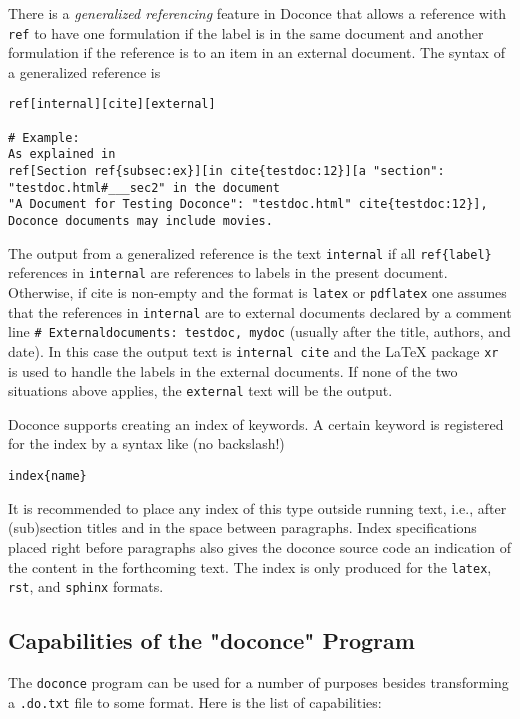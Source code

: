 \documentclass[%
oneside,                 %
final,                   %
10pt]{article}
\begin{document}
There is a \emph{generalized referencing} feature in Doconce that allows
a reference with \Verb!ref! to have one formulation if the label is
in the same document and another formulation if the reference is
to an item in an external document. The syntax of a generalized
reference is
\begin{Verbatim}[numbers=none,fontsize=\fontsize{9pt}{9pt},baselinestretch=0.85,xleftmargin=0mm]
ref[internal][cite][external]

# Example:
As explained in
ref[Section ref{subsec:ex}][in cite{testdoc:12}][a "section":
"testdoc.html#___sec2" in the document
"A Document for Testing Doconce": "testdoc.html" cite{testdoc:12}],
Doconce documents may include movies.
\end{Verbatim}
The output from a generalized reference is the text \Verb!internal! if all
\Verb!ref{label}! references in \Verb!internal! are references to labels in the
present document. Otherwise, if cite is non-empty and the format is
\Verb!latex! or \Verb!pdflatex! one assumes that the references in \Verb!internal!
are to external documents declared by a comment line \Verb!# Externaldocuments: testdoc, mydoc! (usually after the title, authors,
and date). In this case the output text is \Verb!internal cite! and the
{\LaTeX} package \Verb!xr! is used to handle the labels in the external
documents.  If none of the two situations above applies, the
\Verb!external! text will be the output.

Doconce supports creating an index of keywords. A certain keyword
is registered for the index by a syntax like (no
backslash!)
\begin{Verbatim}[numbers=none,fontsize=\fontsize{9pt}{9pt},baselinestretch=0.85,xleftmargin=0mm]
index{name}
\end{Verbatim}
It is recommended to place any index of this type outside
running text, i.e., after (sub)section titles and in the space between
paragraphs. Index specifications placed right before paragraphs also
gives the doconce source code an indication of the content in the
forthcoming text. The index is only produced for the \Verb!latex!, \Verb!rst!, and
\Verb!sphinx! formats.

\subsection{Capabilities of the "doconce" Program}

The \Verb!doconce! program can be used for a number of purposes besides
transforming a \Verb!.do.txt! file to some format. Here is the
list of capabilities:
\end{document}
